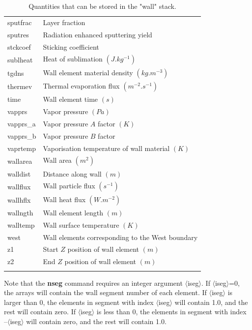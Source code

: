 \documentclass[a4paper,10pt]{report}
\begin{document}
\begin{center}
\begin{longtable}{|l|l|}
    sputfrac \index{b2plot, sputfrac}  & Layer fraction \\
    sputres \index{b2plot, sputres}   & Radiation enhanced sputtering yield \\
    stckcoef \index{b2plot, stckcoef}  & Sticking coefficient \\
    sublheat \index{b2plot, sublheat}  & Heat of sublimation $(J.kg^{-1})$ \\
    tgdns \index{b2plot, tgdns}     & Wall element material density $(kg.m^{-3})$ \\
    thermev \index{b2plot, thermev}   & Thermal evaporation flux $(m^{-2}.s^{-1})$ \\
    time \index{b2plot, time}      & Wall element time $(s)$ \\
    vapprs \index{b2plot, vapprs}    & Vapor pressure $(Pa)$ \\
    vapprs\_a \index{b2plot, vapprs\_a} & Vapor pressure $A$ factor $(K)$ \\
    vapprs\_b \index{b2plot, vapprs\_b} & Vapor pressure $B$ factor \\
    vaprtemp \index{b2plot, vaprtemp}  & Vaporisation temperature of wall material $(K)$ \\
    wallarea \index{b2plot, wallarea}  & Wall area $(m^2)$ \\
    walldist \index{b2plot, walldist}  & Distance along wall $(m)$ \\
    wallflux \index{b2plot, wallflux}  & Wall particle flux $(s^{-1})$ \\
    wallhflx \index{b2plot, wallhflx}  & Wall heat flux $(W.m^{-2})$ \\
    wallngth \index{b2plot, wallngth}  & Wall element length $(m)$ \\
    walltemp \index{b2plot, walltemp}  & Wall surface temperature $(K)$ \\
    west \index{b2plot, west}      & Wall elements corresponding to the West boundary \\
    z1 \index{b2plot, z1}        & Start $Z$ position of wall element $(m)$ \\
    z2 \index{b2plot, z2}        & End $Z$ position of wall element $(m)$ \\
    \hline
    \caption{Quantities that can be stored in the "wall" stack.}
    \label{tab:wallquantities}
  \end{longtable}
\end{center}

Note that the {\bf nseg} command requires an integer
argument $\langle$iseg$\rangle$. If $\langle$iseg$\rangle$=0, the arrays will contain the wall segment
number of each element. If $\langle$iseg$\rangle$ is larger than 0, the elements in segment
with index $\langle$iseg$\rangle$ will contain 1.0, and the rest will contain zero.
If $\langle$iseg$\rangle$ is less than 0, the elements in segment
with index --$\langle$iseg$\rangle$ will contain zero, and the rest will contain 1.0.
\end{document}

